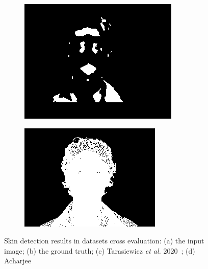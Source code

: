\begin{figure}[h]
{\begin{subfigure}[b]{0.23\textwidth}
         \includegraphics[width=\textwidth]{images/results/cross/w-020-7.color.d3_hgr_sch_skinny_426.png}
         \caption{}
     \end{subfigure}
    \hfill
     \hfill
     \begin{subfigure}[b]{0.23\textwidth}
         \centering
         \includegraphics[width=\textwidth]{images/results/cross/w-020-7.color.d3_hgr_sch_bayes.png}
         \caption{}
     \end{subfigure}}
\caption{Skin detection results in datasets cross evaluation: (a) the input image; (b) the ground truth; (c) Tarasiewicz \textit{et al.} 2020~\cite{tarasiewicz2020skinny}; (d) Acharjee~\cite{acharjee2018skin}}
\label{fig:cross-normal-samples}
\end{figure}%


